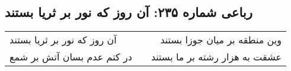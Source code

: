 \begin{center}
\section*{رباعی شماره ۲۳۵: آن روز که نور بر ثریا بستند}
\label{sec:sh235}
\begin{longtable}{l p{0.5cm} r}
آن روز که نور بر ثریا بستند
&&
وین منطقه بر میان جوزا بستند
\\
در کتم عدم بسان آتش بر شمع
&&
عشقت به هزار رشته بر ما بستند
\\
\end{longtable}
\end{center}
